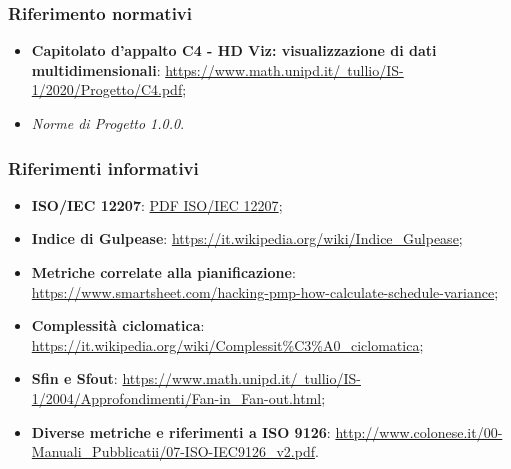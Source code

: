         \subsubsection{Riferimento normativi}
            \begin{itemize}
                \item \textbf{Capitolato d'appalto C4 - HD Viz: visualizzazione di dati multidimensionali}:
                \href{https://www.math.unipd.it/~tullio/IS-1/2020/Progetto/C4.pdf}{https://www.math.unipd.it/~tullio/IS-1/2020/Progetto/C4.pdf};
                \item \textit{Norme di Progetto 1.0.0}.
            \end{itemize}
            
        \subsubsection{Riferimenti informativi}
            \begin{itemize}
                \item \textbf{ISO/IEC 12207}:
                \href{https://www.math.unipd.it/~tullio/IS-1/2009/Approfondimenti/ISO_12207-1995.pdf}{PDF ISO/IEC 12207};
                \item \textbf{Indice di Gulpease}:
                \href{https://it.wikipedia.org/wiki/Indice\_Gulpease}{https://it.wikipedia.org/wiki/Indice\_Gulpease};
                \item \textbf{Metriche correlate alla pianificazione}:
                \href{https://www.smartsheet.com/hacking-pmp-how-calculate-schedule-variance}{https://www.smartsheet.com/hacking-pmp-how-calculate-schedule-variance};
                \item \textbf{Complessità ciclomatica}: \href{https://it.wikipedia.org/wiki/Complessit\%C3\%A0\_ciclomatica}{https://it.wikipedia.org/wiki/Complessit\%C3\%A0\_ciclomatica};
                \item \textbf{Sfin e Sfout}: \href{https://www.math.unipd.it/~tullio/IS-1/2004/Approfondimenti/Fan-in\_Fan-out.html}{https://www.math.unipd.it/~tullio/IS-1/2004/Approfondimenti/Fan-in\_Fan-out.html};
                \item \textbf{Diverse metriche e riferimenti a ISO 9126}: \href{http://www.colonese.it/00-Manuali\_Pubblicatii/07-ISO-IEC9126\_v2.pdf}{http://www.colonese.it/00-Manuali\_Pubblicatii/07-ISO-IEC9126\_v2.pdf}.
            \end{itemize}
